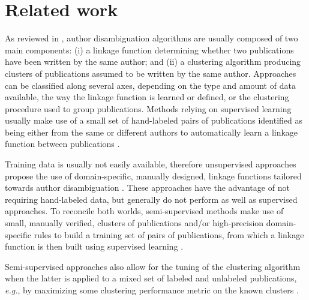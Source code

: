 \documentclass[conference]{IEEEtran}
\newcommand{\eg}{\emph{e.g.}\xspace}
\begin{document}

\section{Related work}
\label{related-works}

As reviewed in \cite{smalheiser2009author,ferreira2012brief,levin2012citation}, author
disambiguation algorithms are usually composed of two main components: (i) a
linkage function determining whether two publications have been written by the
same author; and (ii) a clustering algorithm producing clusters of publications
assumed to be written by the same author.
Approaches can be classified along several axes, depending on the type and
amount of data available, the way the linkage function is learned or defined, or the
clustering procedure used to group publications.
Methods relying on supervised learning usually make use of a small set of hand-labeled pairs
of publications identified as being either from the same or different authors to automatically learn a linkage
function between publications \cite{culotta2007author,treeratpituk2009disambiguating,tran2014author}.

Training data is usually not easily available, therefore unsupervised approaches propose
the use of domain-specific, manually designed, linkage functions tailored towards author
disambiguation \cite{malin2005unsupervised, song2007efficient,
soler2007separating, kang2009co, schulz2014exploiting}.
These approaches have the advantage of not requiring hand-labeled data, but generally do
not perform as well as supervised approaches.
To reconcile both worlds, semi-supervised methods make use of small, manually verified, clusters of
publications and/or high-precision domain-specific rules to build a training
set of pairs of publications, from which a linkage function is then built using supervised learning
\cite{ferreira2010effective,torvik2009author,levin2012citation}.

Semi-supervised approaches also allow for the tuning of the
clustering algorithm when the latter is applied to a mixed set of labeled
and unlabeled publications, \eg, by maximizing some clustering performance
metric on the known clusters \cite{levin2012citation}.
\end{document}
